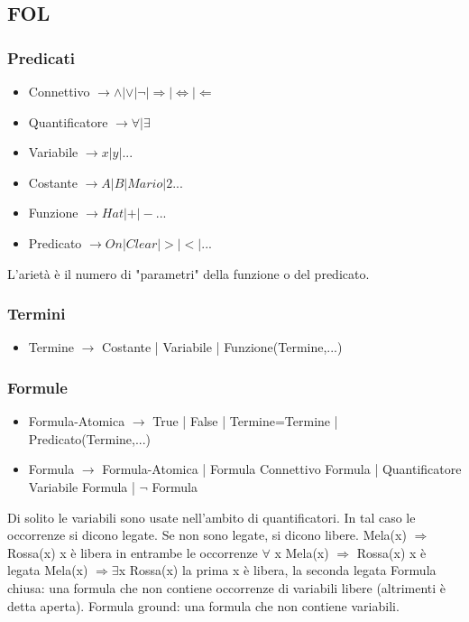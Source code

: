 \documentclass{article}
\begin{document}
\subsection{FOL}
\subsubsection{Predicati}
\begin{itemize}
    \item Connettivo $\rightarrow \land | \lor | \neg | \Rightarrow | \Leftrightarrow | \Leftarrow$
    \item Quantificatore $\rightarrow \forall | \exists $
    \item Variabile $\rightarrow x | y | ...$
    \item Costante $\rightarrow A | B | Mario | 2 ...$
    \item Funzione $\rightarrow Hat | + | - ...$
    \item Predicato $\rightarrow On | Clear | > | < | ...$
\end{itemize}
L'arietà è il numero di "parametri" della funzione o del predicato.
\subsubsection{Termini}
\begin{itemize}
    \item Termine $\rightarrow$ Costante | Variabile | Funzione(Termine,...)
\end{itemize}
\subsubsection{Formule}
\begin{itemize}
    \item Formula-Atomica $\rightarrow$ True | False | Termine=Termine | Predicato(Termine,...)
    \item Formula $\rightarrow$ Formula-Atomica | Formula Connettivo Formula | Quantificatore Variabile Formula | $\neg$ Formula
\end{itemize}
Di solito le variabili sono usate nell'ambito di quantificatori. In tal caso le occorrenze si dicono legate. Se non sono legate, si dicono libere. \newline
    Mela(x) $\Rightarrow$ Rossa(x) \quad x è libera in entrambe le occorrenze \newline
	$\forall$ x Mela(x) $\Rightarrow$ Rossa(x) \quad x è legata \newline
	Mela(x) $\Rightarrow \exists$x Rossa(x) \quad la prima x è libera, la seconda legata \newline
Formula chiusa: una formula che non contiene occorrenze di variabili libere (altrimenti è detta aperta).\newline
Formula ground: una formula che non contiene variabili.
\end{document}
